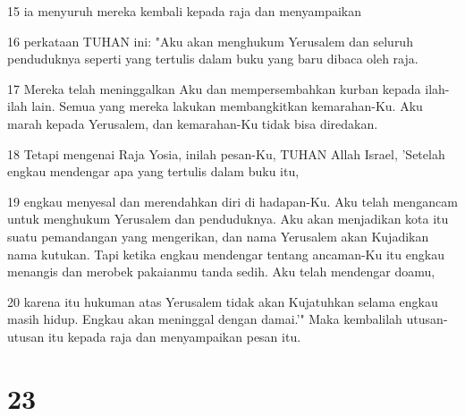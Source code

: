 \par 15 ia menyuruh mereka kembali kepada raja dan menyampaikan
\par 16 perkataan TUHAN ini: "Aku akan menghukum Yerusalem dan seluruh penduduknya seperti yang tertulis dalam buku yang baru dibaca oleh raja.
\par 17 Mereka telah meninggalkan Aku dan mempersembahkan kurban kepada ilah-ilah lain. Semua yang mereka lakukan membangkitkan kemarahan-Ku. Aku marah kepada Yerusalem, dan kemarahan-Ku tidak bisa diredakan.
\par 18 Tetapi mengenai Raja Yosia, inilah pesan-Ku, TUHAN Allah Israel, 'Setelah engkau mendengar apa yang tertulis dalam buku itu,
\par 19 engkau menyesal dan merendahkan diri di hadapan-Ku. Aku telah mengancam untuk menghukum Yerusalem dan penduduknya. Aku akan menjadikan kota itu suatu pemandangan yang mengerikan, dan nama Yerusalem akan Kujadikan nama kutukan. Tapi ketika engkau mendengar tentang ancaman-Ku itu engkau menangis dan merobek pakaianmu tanda sedih. Aku telah mendengar doamu,
\par 20 karena itu hukuman atas Yerusalem tidak akan Kujatuhkan selama engkau masih hidup. Engkau akan meninggal dengan damai.'" Maka kembalilah utusan-utusan itu kepada raja dan menyampaikan pesan itu.

\chapter{23}

